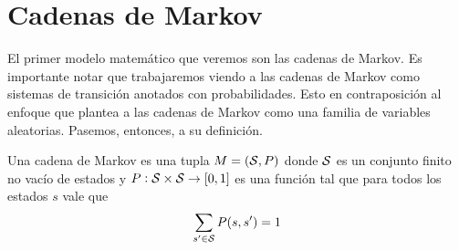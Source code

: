 












\section{Cadenas de Markov}

El primer modelo matemático que veremos son las cadenas de Markov. Es
importante notar que trabajaremos viendo a las cadenas de Markov como sistemas
de transición anotados con probabilidades. Esto en contraposición al enfoque
que plantea a las cadenas de Markov como una familia de variables aleatorias.
Pasemos, entonces, a su definición.

\begin{definition}
	Una cadena de Markov es una tupla $M = (\mathcal{S}, P)$ donde $\mathcal{S}$ es un conjunto finito no vacío de estados y $P: \mathcal{S} \times \mathcal{S} \rightarrow [0,1]$ es una función tal que para todos los estados $s$ vale que
	$$ \sum_{s' \in \mathcal{S}} P(s, s') = 1$$
\end{definition}


